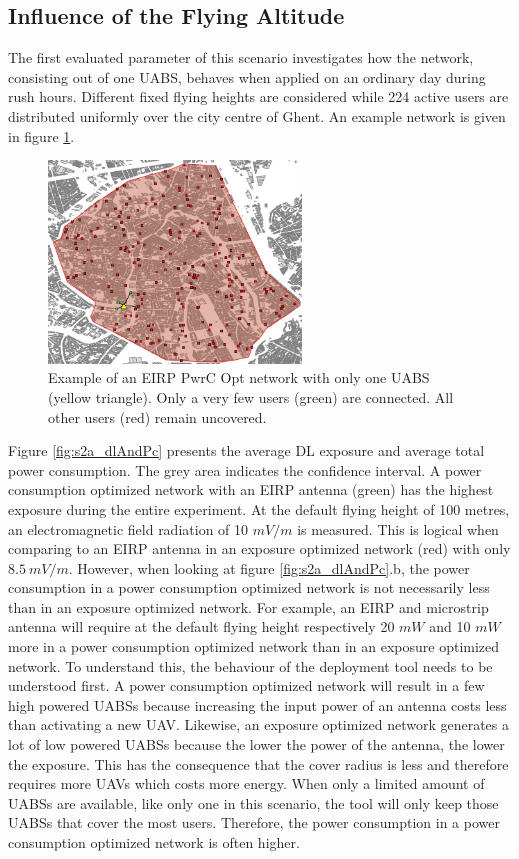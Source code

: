 \subsection{Influence of the Flying Altitude}
The first evaluated parameter of this scenario investigates how the network, consisting out of one \acs{UABS}, behaves when applied on an ordinary day during rush hours. 
Different fixed flying heights are considered while 224 active users are distributed uniformly over the city centre of Ghent. 
An example network is given in figure \ref{fig:s2a:distribution}.
\begin{figure}[h]
  \centering
  \includegraphics[width=0.6\textwidth]{../images/ghentDistribution_pcEIRP_1drone.jpg}
  \caption{Example of an EIRP \gls{PwrC Opt} network with only one \acs{UABS} (yellow triangle). Only a very few users (green) are connected.
  All other users (red) remain uncovered.}
  \label{fig:s2a:distribution}
\end{figure}

Figure \ref{fig:s2a_dlAndPc} presents the average \gls{DL} exposure and average total power consumption. The grey area indicates the confidence interval. 
A power consumption optimized network with an \gls{EIRP} antenna (green) has the highest exposure during the 
entire experiment. At the default flying height of 100 metres, an electromagnetic field radiation 
of 10 $mV/m$ is measured.
This is logical when comparing to an EIRP antenna in an exposure optimized network (red) with only $8.5\ mV/m$. 
However, when looking at figure \ref{fig:s2a_dlAndPc}.b, the power consumption in a power consumption optimized network is not necessarily less 
than in an exposure optimized network. 
For example, an \gls{EIRP} and microstrip antenna will require at the default flying height respectively
20 $mW$ and 10 $mW$ more in a power consumption optimized network than in an exposure optimized network.
To understand this, the behaviour of the deployment tool needs to be understood first. 
A power consumption optimized network will result in a few high powered \gls{UABS}s because increasing the input power of an antenna costs 
less than activating a new  \gls{UAV}. Likewise, an exposure optimized network 
generates a lot of low powered \gls{UABS}s because the lower the power of the antenna, the lower the exposure. This has the consequence that the cover radius 
is less and therefore requires more \gls{UAV}s which costs more energy.
When only a limited amount of \gls{UABS}s are available, 
like only one in this scenario, the tool will only keep those \gls{UABS}s that cover the most users. 
Therefore, the power consumption in a power consumption optimized network is often higher. 

